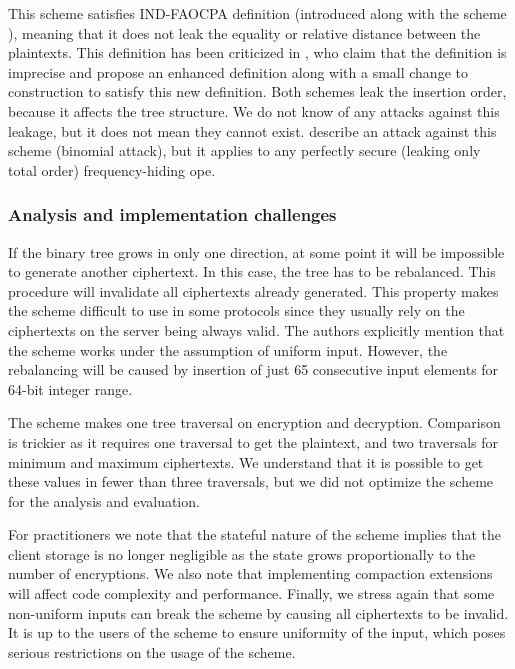 		This scheme satisfies IND-FAOCPA definition (introduced along with the scheme \cite{fh-ope}), meaning that it does not leak the equality or relative distance between the plaintexts.
		This definition has been criticized in \cite{florian-def-critique}, who claim that the definition is imprecise and propose an enhanced definition along with a small change to construction to satisfy this new definition.
		Both schemes leak the insertion order, because it affects the tree structure.
		We do not know of any attacks against this leakage, but it does not mean they cannot exist.
		\textcite{leakage-abuse-grubs-2017} describe an attack against this scheme (binomial attack), but it applies to any perfectly secure (leaking only total order) frequency-hiding \acrshort{ope}.

	\subsubsection{Analysis and implementation challenges}

		If the binary tree grows in only one direction, at some point it will be impossible to generate another ciphertext.
		In this case, the tree has to be rebalanced.
		This procedure will invalidate all ciphertexts already generated.
		This property makes the scheme difficult to use in some protocols since they usually rely on the ciphertexts on the server being always valid.
		The authors explicitly mention that the scheme works under the assumption of uniform input.
		However, the rebalancing will be caused by insertion of just 65 consecutive input elements for 64-bit integer range.

		The scheme makes one tree traversal on encryption and decryption.
		Comparison is trickier as it requires one traversal to get the plaintext, and two traversals for minimum and maximum ciphertexts.
		We understand that it is possible to get these values in fewer than three traversals, but we did not optimize the scheme for the analysis and evaluation.

		For practitioners we note that the stateful nature of the scheme implies that the client storage is no longer negligible as the state grows proportionally to the number of encryptions.
		We also note that implementing compaction extensions will affect code complexity and performance.
		Finally, we stress again that some non-uniform inputs can break the scheme by causing all ciphertexts to be invalid.
		It is up to the users of the scheme to ensure uniformity of the input, which poses serious restrictions on the usage of the scheme.
